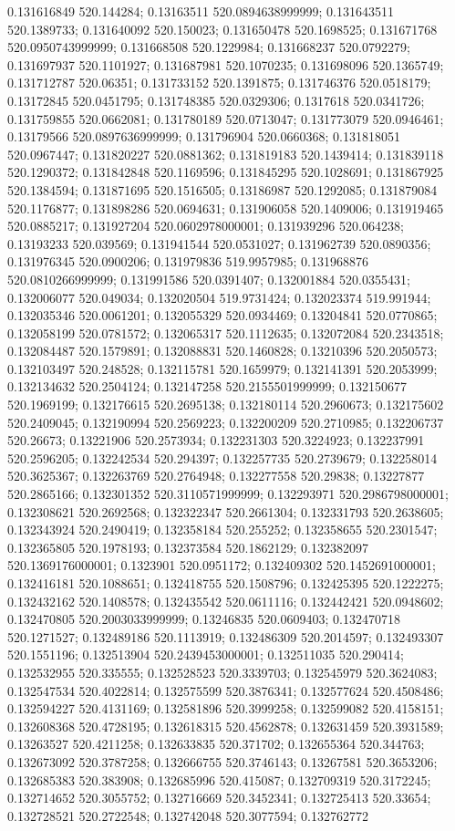0.131616849 520.144284; 0.13163511 520.0894638999999; 0.131643511 520.1389733; 0.131640092 520.150023; 0.131650478 520.1698525; 0.131671768 520.0950743999999; 0.131668508 520.1229984; 0.131668237 520.0792279; 0.131697937 520.1101927; 0.131687981 520.1070235; 0.131698096 520.1365749; 0.131712787 520.06351; 0.131733152 520.1391875; 0.131746376 520.0518179; 0.13172845 520.0451795; 0.131748385 520.0329306; 0.1317618 520.0341726; 0.131759855 520.0662081; 0.131780189 520.0713047; 0.131773079 520.0946461; 0.13179566 520.0897636999999; 0.131796904 520.0660368; 0.131818051 520.0967447; 0.131820227 520.0881362; 0.131819183 520.1439414; 0.131839118 520.1290372; 0.131842848 520.1169596; 0.131845295 520.1028691; 0.131867925 520.1384594; 0.131871695 520.1516505; 0.13186987 520.1292085; 0.131879084 520.1176877; 0.131898286 520.0694631; 0.131906058 520.1409006; 0.131919465 520.0885217; 0.131927204 520.0602978000001; 0.131939296 520.064238; 0.13193233 520.039569; 0.131941544 520.0531027; 0.131962739 520.0890356; 0.131976345 520.0900206; 0.131979836 519.9957985; 0.131968876 520.0810266999999; 0.131991586 520.0391407; 0.132001884 520.0355431; 0.132006077 520.049034; 0.132020504 519.9731424; 0.132023374 519.991944; 0.132035346 520.0061201; 0.132055329 520.0934469; 0.13204841 520.0770865; 0.132058199 520.0781572; 0.132065317 520.1112635; 0.132072084 520.2343518; 0.132084487 520.1579891; 0.132088831 520.1460828; 0.13210396 520.2050573; 0.132103497 520.248528; 0.132115781 520.1659979; 0.132141391 520.2053999; 0.132134632 520.2504124; 0.132147258 520.2155501999999; 0.132150677 520.1969199; 0.132176615 520.2695138; 0.132180114 520.2960673; 0.132175602 520.2409045; 0.132190994 520.2569223; 0.132200209 520.2710985; 0.132206737 520.26673; 0.13221906 520.2573934; 0.132231303 520.3224923; 0.132237991 520.2596205; 0.132242534 520.294397; 0.132257735 520.2739679; 0.132258014 520.3625367; 0.132263769 520.2764948; 0.132277558 520.29838; 0.13227877 520.2865166; 0.132301352 520.3110571999999; 0.132293971 520.2986798000001; 0.132308621 520.2692568; 0.132322347 520.2661304; 0.132331793 520.2638605; 0.132343924 520.2490419; 0.132358184 520.255252; 0.132358655 520.2301547; 0.132365805 520.1978193; 0.132373584 520.1862129; 0.132382097 520.1369176000001; 0.1323901 520.0951172; 0.132409302 520.1452691000001; 0.132416181 520.1088651; 0.132418755 520.1508796; 0.132425395 520.1222275; 0.132432162 520.1408578; 0.132435542 520.0611116; 0.132442421 520.0948602; 0.132470805 520.2003033999999; 0.13246835 520.0609403; 0.132470718 520.1271527; 0.132489186 520.1113919; 0.132486309 520.2014597; 0.132493307 520.1551196; 0.132513904 520.2439453000001; 0.132511035 520.290414; 0.132532955 520.335555; 0.132528523 520.3339703; 0.132545979 520.3624083; 0.132547534 520.4022814; 0.132575599 520.3876341; 0.132577624 520.4508486; 0.132594227 520.4131169; 0.132581896 520.3999258; 0.132599082 520.4158151; 0.132608368 520.4728195; 0.132618315 520.4562878; 0.132631459 520.3931589; 0.13263527 520.4211258; 0.132633835 520.371702; 0.132655364 520.344763; 0.132673092 520.3787258; 0.132666755 520.3746143; 0.13267581 520.3653206; 0.132685383 520.383908; 0.132685996 520.415087; 0.132709319 520.3172245; 0.132714652 520.3055752; 0.132716669 520.3452341; 0.132725413 520.33654; 0.132728521 520.2722548; 0.132742048 520.3077594; 0.132762772 